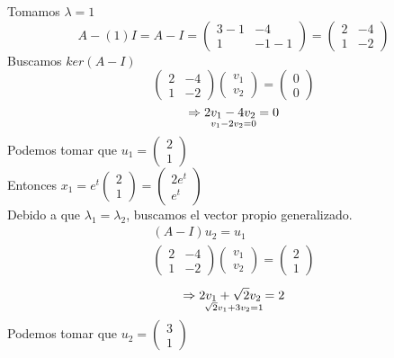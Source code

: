 Tomamos $\lambda=1$
\begin{equation*}
    A - (1) I = A - I =
\begin{pmatrix}
3 - 1 & -4\\
1 & -1 - 1
\end{pmatrix}
=
\begin{pmatrix}
2 & -4\\
1 & -2
\end{pmatrix}
\end{equation*}
Buscamos $ker(A -I)$
\begin{equation*}
\begin{pmatrix}
2 & -4\\
1 & -2
\end{pmatrix}
\begin{pmatrix}
v_{1}   \\
v_{2}  
\end{pmatrix} =
\begin{pmatrix}
0   \\
0  
\end{pmatrix}
\end{equation*}
\begin{equation*}
    \Rightarrow 2v_{1}-4v_{2}=0 \atop
    v_{1}-2v_{2} =0
\end{equation*}
Podemos tomar que $u_{1}=\begin{pmatrix}
2 \\
1
\end{pmatrix}$ \\

Entonces $x_{1}=e^{t}\begin{pmatrix}
2\\
1
\end{pmatrix}
=
\begin{pmatrix}
2e^{t} \\
e^{t}
\end{pmatrix}$ \\
Debido a que $\lambda_{1}=\lambda_{2}$, buscamos el vector propio generalizado.
\begin{equation*}
\begin{split}
    (A-I)u_{2}=u_{1} \\
\begin{pmatrix}
2 & -4\\
1 & -2
\end{pmatrix}
\begin{pmatrix}
v_{1}   \\
v_{2}  
\end{pmatrix} =
\begin{pmatrix}
2   \\
1  
\end{pmatrix}
\end{split}
\end{equation*}
\begin{equation*}
    \Rightarrow 2v_{1}+ \sqrt{2}v_{2}=2 \atop
    \sqrt{2}v_{1}+3v_{2} =1
\end{equation*}
Podemos tomar que $u_{2}=\begin{pmatrix}
3 \\
1
\end{pmatrix}$ \\


